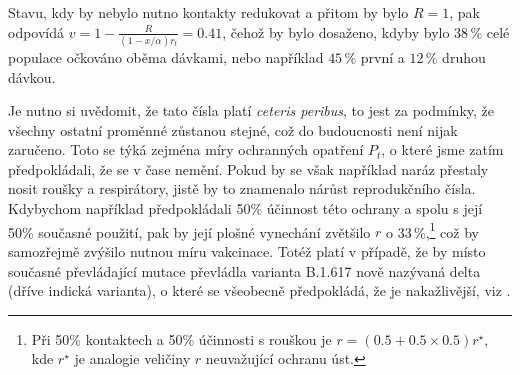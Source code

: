 Stavu, kdy by nebylo nutno kontakty redukovat a přitom by bylo $R=1$,
pak odpovídá $v=1-\frac{R}{(1-x/\alpha)r_{t}}=0.41$, čehož by bylo dosaženo, kdyby bylo 38\,\% celé populace očkováno oběma dávkami, nebo
například $45\,\%$ první a $12\,\%$ druhou dávkou.

Je nutno si uvědomit, že tato čísla platí \emph{ceteris peribus},
to jest za podmínky, že všechny ostatní proměnné zůstanou stejné, což do budoucnosti není nijak zaručeno.
Toto se týká zejména míry ochranných opatření $P_{t}$, o které jsme zatím
předpokládali, že se v čase nemění. Pokud by se však například
naráz přestaly nosit roušky a respirátory, jistě by to znamenalo nárůst
reprodukčního čísla. Kdybychom například předpokládali 50\%
účinnost této ochrany a spolu s \cite{paqcovid} její 50\% současné
použití, pak by její plošné vynechání zvětšilo $r$ o 33\,\%,\footnote{Při 50\% kontaktech a 50\% účinnosti s rouškou je $r=(0.5+0.5\times0.5)r^{\star}$,
kde $r^{\star}$ je analogie veličiny $r$ neuvažující ochranu úst.} což by samozřejmě zvýšilo nutnou míru vakcinace. Totéž platí v případě,
že by místo současné převládající mutace převládla 
varianta B.1.617 nově nazývaná delta (dříve indická varianta), o které se všeobecně předpokládá, že je nakažlivější,
viz \cite{ecdc2021india}. 

